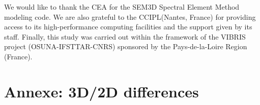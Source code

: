 \documentclass[extra,mreferee]{gji}
\begin{document}
\begin{acknowledgments}
We would like to thank the CEA for the SEM3D Spectral Element Method modeling code. We are also grateful to the CCIPL(Nantes, France) for providing access to its high-performance computing facilities and the support given  by its staff. Finally, this study was carried out within the framework of the VIBRIS project (OSUNA-IFSTTAR-CNRS) sponsored by the Pays-de-la-Loire Region (France). 
\end{acknowledgments}

\clearpage
\newpage




\clearpage
\newpage

\section*{Annexe: 3D/2D differences}
\end{document}

